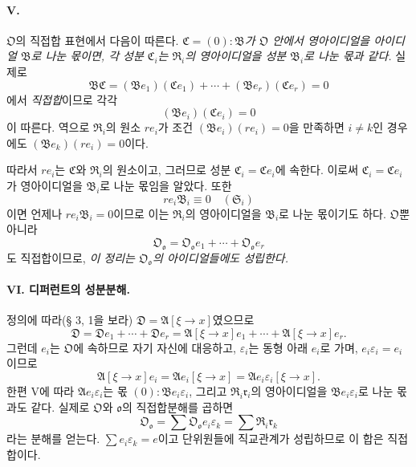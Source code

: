 \paragraph{V.}
\(\mathfrak O\)의 직접합 표현에서 다음이 따른다. \emph{\(\mathfrak C=(0):\mathfrak B\)가 \(\mathfrak O\) 안에서 영아이디얼을 아이디얼 \(\mathfrak B\)로 나눈 몫이면, 각 성분 \(\mathfrak C_i\)는 \(\mathfrak R_i\)의 영아이디얼을 성분 \(\mathfrak B_i\)로 나눈 몫과 같다.} 실제로
\[
\mathfrak B\mathfrak C=(\mathfrak B e_1)(\mathfrak C e_1)+\cdots+(\mathfrak B e_r)(\mathfrak C e_r)=0
\]
에서 \emph{직접합}이므로 각각
\[
(\mathfrak B e_i)(\mathfrak C e_i)=0
\]
이 따른다. 역으로 \(\mathfrak R_i\)의 원소 \(r e_i\)가 조건 \((\mathfrak B e_i)(r e_i)=0\)을 만족하면 \(i\ne k\)인 경우에도 \((\mathfrak B e_k)(r e_i)=0\)이다.

따라서 \(r e_i\)는 \(\mathfrak C\)와 \(\mathfrak R_i\)의 원소이고, 그러므로 성분 \(\mathfrak C_i=\mathfrak C e_i\)에 속한다. 이로써 \(\mathfrak C_i=\mathfrak C e_i\)가 영아이디얼을 \(\mathfrak B_i\)로 나눈 몫임을 알았다. 또한
\[
r e_i\mathfrak B_i\equiv0\quad(\mathfrak S_i)
\]
이면 언제나 \(r e_i\mathfrak B_i=0\)이므로 이는 \(\mathfrak R_i\)의 영아이디얼을 \(\mathfrak B_i\)로 나눈 몫이기도 하다. \(\mathfrak O\)뿐 아니라
\[
\mathfrak O_{\mathfrak o}=\mathfrak O_{\mathfrak o}e_1+\cdots+\mathfrak O_{\mathfrak o}e_r
\]
도 직접합이므로, \emph{이 정리는 \(\mathfrak O_{\mathfrak o}\)의 아이디얼들에도 성립한다.}

\paragraph{VI. 디퍼런트의 성분분해.}
정의에 따라(§ 3, 1을 보라) \(\mathfrak D=\mathfrak A[\xi\to x]\)였으므로
\[
\mathfrak D=\mathfrak D e_1+\cdots+\mathfrak D e_r
=\mathfrak A[\xi\to x]e_1+\cdots+\mathfrak A[\xi\to x]e_r.
\]
그런데 \(e_i\)는 \(\mathfrak O\)에 속하므로 자기 자신에 대응하고, \(\varepsilon_i\)는 동형 아래 \(e_i\)로 가며, \(e_i\varepsilon_i=e_i\)이므로
\[
\mathfrak A[\xi\to x]e_i=\mathfrak A e_i[\xi\to x]
=\mathfrak A e_i\varepsilon_i[\xi\to x].
\]
한편 V에 따라 \(\mathfrak A e_i\varepsilon_i\)는 몫 \((0):\mathfrak B e_i\varepsilon_i\), 그리고 \(\mathfrak R_i\mathfrak r_i\)의 영아이디얼을 \(\mathfrak B e_i\varepsilon_i\)로 나눈 몫과도 같다. 실제로 \(\mathfrak O\)와 \(\mathfrak o\)의 직접합분해를 곱하면
\[
\mathfrak O_{\mathfrak o}=\sum\mathfrak O_{\mathfrak o}e_i\varepsilon_k
=\sum\mathfrak R_i\mathfrak r_k
\]
라는 분해를 얻는다. \(\sum e_i\varepsilon_k=e\)이고 단위원들에 직교관계가 성립하므로 이 합은 직접합이다.

